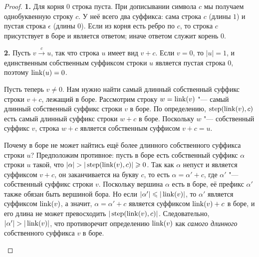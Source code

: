 \begin{proof}
    \textbf{1.} Для корня $0$ строка пуста. При дописывании символа $c$ мы получаем однобуквенную строку $c$. У неё всего два суффикса: сама строка $c$ (длины $1$) и пустая строка $\epsilon$ (длины $0$). Если из корня есть ребро по $c$, то строка $c$ присутствует в боре и является ответом; иначе ответом служит корень $0$.

    \textbf{2.} Пусть $v \xrightarrow{c} u$, так что строка $u$ имеет вид $v + c$. Если $v = 0$, то $|u| = 1$, и единственным собственным суффиксом строки $u$ является пустая строка $0$, поэтому $\operatorname{link}(u) = 0$.

    Пусть теперь $v \ne 0$. Нам нужно найти самый длинный собственный суффикс строки $v + c$, лежащий в боре. Рассмотрим строку $w = \operatorname{link}(v)$ "--- самый длинный собственный суффикс строки $v$ в боре. По определению, $\operatorname{step}(\operatorname{link}(v), c)$ есть самый длинный суффикс строки $w + c$ в боре. Поскольку $w$ "--- собственный суффикс $v$, строка $w + c$ является собственным суффисом $v + c = u$.

    Почему в боре не может найтись ещё более длинного собственного суффикса строки $u$? Предположим противное: пусть в боре есть собственный суффикс $\alpha$ строки $u$ такой, что $|\alpha| > |\operatorname{step}(\operatorname{link}(v), c)| \geqslant 0$. Так как $\alpha$ непуст и является суффиксом $v + c$, он заканчивается на букву $c$, то есть $\alpha = \alpha' + c$, где $\alpha'$ "--- собственный суффикс строки $v$. Поскольку вершина $\alpha$ есть в боре, её префикс $\alpha'$ также обязан быть вершиной бора. Но если $|\alpha'| \leqslant |\operatorname{link}(v)|$, то $\alpha'$ является суффиксом $\operatorname{link}(v)$, а значит, $\alpha = \alpha' + c$ является суффиксом $\operatorname{link}(v) + c$ в боре, и его длина не может превосходить $|\operatorname{step}(\operatorname{link}(v), c)|$. Следовательно, $|\alpha'| > |\operatorname{link}(v)|$, что противоречит определению $\operatorname{link}(v)$ как \emph{самого длинного} собственного суффикса $v$ в боре.

    \begin{center}
\end{center}
\end{proof}
